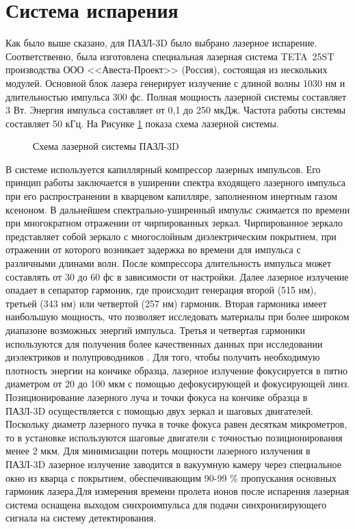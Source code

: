\section{Система испарения}\label{sec:ch2/sec3}

Как было выше сказано, для ПАЗЛ-3D было выбрано лазерное испарение. Соответственно, была изготовлена специальная лазерная система TETA~25ST производства ООО <<Авеста-Проект>> (Россия), состоящая из нескольких модулей. Основной блок лазера генерирует излучение с длиной волны 1030 нм и длительностью импульса 300 фс. Полная мощность лазерной системы составляет 3 Вт. Энергия импульса составляет от 0,1 до 250 мкДж. Частота работы системы составляет 50 кГц. На Рисунке \cref{fig:APPLE_lasersystem} показа схема лазерной системы.

\begin{figure}[htb]
	\caption{Схема лазерной системы ПАЗЛ-3D}
	\label{fig:APPLE_lasersystem}
\end{figure}

В системе используется капиллярный компрессор лазерных импульсов. Его принцип работы заключается в уширении спектра входящего лазерного импульса при его распространении в кварцевом капилляре, заполненном инертным газом ксеноном. В дальнейшем спектрально-уширенный импульс сжимается по времени при многократном отражении от чирпированных зеркал. Чирпированное зеркало представляет собой зеркало с многослойным диэлектрическим покрытием, при отражении от которого возникает задержка во времени для импульса с различными длинами волн. После компрессора длительность импульса может составлять от 30 до 60 фс в зависимости от настройки. Далее лазерное излучение опадает в сепаратор гармоник, где происходит генерация второй (515 нм), третьей (343 нм) или четвертой (257 нм) гармоник. Вторая гармоника имеет наибольшую мощность, что позволяет исследовать материалы при более широком диапазоне возможных энергий импульса. Третья и четвертая гармоники используются для получения более качественных данных при исследовании диэлектриков и полупроводников \cite{Gault06}. Для того, чтобы получить необходимую плотность энергии на кончике образца, лазерное излучение фокусируется в пятно диаметром от 20 до 100 мкм с помощью дефокусирующей и фокусирующей линз. Позиционирование лазерного луча и точки фокуса на кончике образца в ПАЗЛ-3D осуществляется с помощью двух зеркал и шаговых двигателей. Поскольку диаметр лазерного пучка в точке фокуса равен десяткам микрометров, то в установке используются шаговые двигатели с точностью позиционирования менее 2 мкм. Для минимизации потерь мощности лазерного излучения в ПАЗЛ-3D лазерное излучение заводится в вакуумную камеру через специальное окно из кварца с покрытием, обеспечивающим 90-99 \% пропускания основных гармоник лазера.Для измерения времени пролета ионов после испарения лазерная система оснащена выходом синхроимпульса для подачи синхронизирующего сигнала на систему детектирования.

